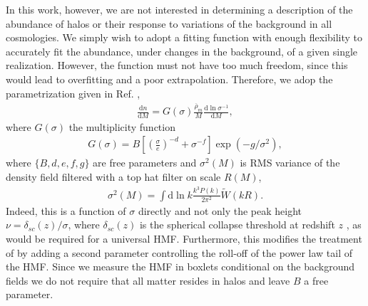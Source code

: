 In this work, however, we are not interested in determining a description of the abundance of halos or their response to variations of the background in all cosmologies. We simply wish to adopt a fitting function with enough flexibility to accurately fit the abundance, under changes in the background, of a given single realization. However, the function must not have too much freedom, since this would lead to overfitting and a poor extrapolation. Therefore, we adop the parametrization given in Ref. \citep{aemulushmf},
\begin{align}
\frac{\mathrm{d}n}{\mathrm{d}M} = G(\sigma)\frac{\overline{\rho}_m}{M}\frac{\mathrm{d}\ln{\sigma^{-1}}}{\mathrm{d}M}, \label{aemulus_hmf}
\end{align}
where $G(\sigma)$ the multiplicity function
\begin{align}
G(\sigma) = B \left[ \left( \frac{\sigma}{e}\right)^{-d} + \sigma^{-f} \right] \exp{\left( -g / \sigma^2 \right)}, \label{aemulus_G}
\end{align}
where $\{B, d, e, f, g\}$ are free parameters and $\sigma^2(M)$ is RMS variance of the density field filtered with a top hat filter on scale $R(M)$,
\begin{align}
\sigma^2(M) = \int \mathrm{d}\ln{k} \frac{k^3 P(k)}{2\pi^2} \tilde{W}(kR).
\end{align}
Indeed, this is a function of $\sigma$ directly and not only the peak height $\nu = \delta_{sc}(z)/\sigma$, where $\delta_{sc}(z)$ is the spherical collapse threshold at redshift $z$ \citep{halomodelreview}, as would be required for a universal HMF. Furthermore, this modifies the treatment of \citep{tinker2008} by adding a second parameter controlling the roll-off of the power law tail of the HMF. Since we measure the HMF in boxlets conditional on the background fields we do not require that all matter resides in halos and leave $B$ a free parameter.

